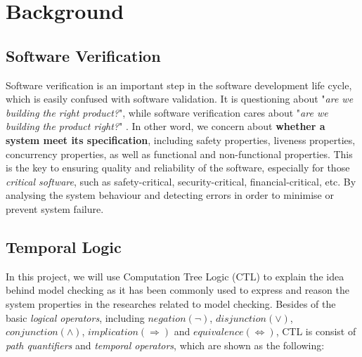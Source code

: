 
\chapter{Background}

\section{Software Verification}
Software verification is an important step in the software development life cycle, which is easily confused with software validation. It is questioning about "\textit{are we building the right product?}", while software verification cares about "\textit{are we building the product right?}" \cite{kung2008software}. In other word, we concern about \textbf{whether a system meet its specification}, including safety properties, liveness properties, concurrency properties, as well as functional and non-functional properties. This is the key to ensuring quality and reliability of the software, especially for those \textit{critical software}, such as safety-critical, security-critical, financial-critical, etc. By analysing the system behaviour and detecting errors in order to minimise or prevent system failure. 

\section{Temporal Logic}
In this project, we will use Computation Tree Logic (CTL) to explain the idea behind model checking as it has been commonly used to express and reason the system properties in the researches related to model checking. Besides of the basic \textit{logical operators}, including $negation (\neg)$, $disjunction (\lor)$, $conjunction (\land)$, $implication (\Rightarrow)$ and $equivalence (\Leftrightarrow)$, CTL is consist of \textit{path quantifiers} and \textit{temporal operators}, which are shown as the following:

